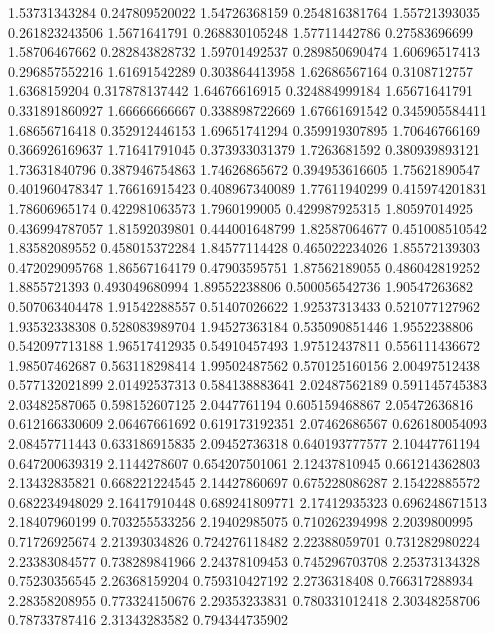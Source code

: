   1.53731343284   0.247809520022
  1.54726368159   0.254816381764
  1.55721393035   0.261823243506
   1.5671641791   0.268830105248
  1.57711442786    0.27583696699
  1.58706467662   0.282843828732
  1.59701492537   0.289850690474
  1.60696517413   0.296857552216
  1.61691542289   0.303864413958
  1.62686567164     0.3108712757
   1.6368159204   0.317878137442
  1.64676616915   0.324884999184
  1.65671641791   0.331891860927
  1.66666666667   0.338898722669
  1.67661691542   0.345905584411
  1.68656716418   0.352912446153
  1.69651741294   0.359919307895
  1.70646766169   0.366926169637
  1.71641791045   0.373933031379
   1.7263681592   0.380939893121
  1.73631840796   0.387946754863
  1.74626865672   0.394953616605
  1.75621890547   0.401960478347
  1.76616915423   0.408967340089
  1.77611940299   0.415974201831
  1.78606965174   0.422981063573
   1.7960199005   0.429987925315
  1.80597014925   0.436994787057
  1.81592039801   0.444001648799
  1.82587064677   0.451008510542
  1.83582089552   0.458015372284
  1.84577114428   0.465022234026
  1.85572139303   0.472029095768
  1.86567164179    0.47903595751
  1.87562189055   0.486042819252
   1.8855721393   0.493049680994
  1.89552238806   0.500056542736
  1.90547263682   0.507063404478
  1.91542288557    0.51407026622
  1.92537313433   0.521077127962
  1.93532338308   0.528083989704
  1.94527363184   0.535090851446
   1.9552238806   0.542097713188
  1.96517412935    0.54910457493
  1.97512437811   0.556111436672
  1.98507462687   0.563118298414
  1.99502487562   0.570125160156
  2.00497512438   0.577132021899
  2.01492537313   0.584138883641
  2.02487562189   0.591145745383
  2.03482587065   0.598152607125
   2.0447761194   0.605159468867
  2.05472636816   0.612166330609
  2.06467661692   0.619173192351
  2.07462686567   0.626180054093
  2.08457711443   0.633186915835
  2.09452736318   0.640193777577
  2.10447761194   0.647200639319
   2.1144278607   0.654207501061
  2.12437810945   0.661214362803
  2.13432835821   0.668221224545
  2.14427860697   0.675228086287
  2.15422885572   0.682234948029
  2.16417910448   0.689241809771
  2.17412935323   0.696248671513
  2.18407960199   0.703255533256
  2.19402985075   0.710262394998
   2.2039800995    0.71726925674
  2.21393034826   0.724276118482
  2.22388059701   0.731282980224
  2.23383084577   0.738289841966
  2.24378109453   0.745296703708
  2.25373134328    0.75230356545
  2.26368159204   0.759310427192
   2.2736318408   0.766317288934
  2.28358208955   0.773324150676
  2.29353233831   0.780331012418
  2.30348258706    0.78733787416
  2.31343283582   0.794344735902
